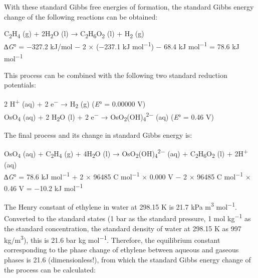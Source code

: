 \documentclass{article}
\begin{document}
With these standard Gibbs free energies of formation, the standard Gibbs energy change of the following reactions can be obtained:

\begin{center}
C\textsubscript{2}H\textsubscript{4} (g) + 2H\textsubscript{2}O (l) → C\textsubscript{2}H\textsubscript{6}O\textsubscript{2} (l) + H\textsubscript{2} (g)\\[2pt]
∆\emph{G}° = −327.2 kJ/mol − 2 × (−237.1 kJ mol\textsuperscript{−1}) − 68.4 kJ mol\textsuperscript{−1} = 78.6 kJ mol\textsuperscript{−1}
\end{center}

This process can be combined with the following two standard reduction potentials:

\begin{center}
2 H\textsuperscript{+} (aq) + 2 e\textsuperscript{−} → H\textsubscript{2} (g) \quad (\emph{E}° = 0.00000 V)\\[2pt]
OsO\textsubscript{4} (aq) + 2 H\textsubscript{2}O (l) + 2 e\textsuperscript{−} → OsO\textsubscript{2}(OH)\textsubscript{4}\textsuperscript{2−} (aq) \quad (\emph{E}° = 0.46 V)
\end{center}

The final process and its change in standard Gibbs energy is:

\begin{center}
OsO\textsubscript{4} (aq) + C\textsubscript{2}H\textsubscript{4} (g) + 4H\textsubscript{2}O (l) → OsO\textsubscript{2}(OH)\textsubscript{4}\textsuperscript{2−} (aq) + C\textsubscript{2}H\textsubscript{6}O\textsubscript{2} (l) + 2H\textsuperscript{+} (aq)\\[2pt]
∆\emph{G}° = 78.6 kJ mol\textsuperscript{−1} + 2 × 96485 C mol\textsuperscript{−1} × 0.000 V − 2 × 96485 C mol\textsuperscript{−1} × 0.46 V = −10.2 kJ mol\textsuperscript{−1}
\end{center}

The Henry constant of ethylene in water at 298.15 K is 21.7 kPa m\textsuperscript{3} mol\textsuperscript{−1}. Converted to the standard states (1 bar as the standard pressure, 1 mol kg\textsuperscript{−1} as the standard concentration, the standard density of water at 298.15 K as 997 kg/m\textsuperscript{3}), this is 21.6 bar kg mol\textsuperscript{−1}. Therefore, the equilibrium constant corresponding to the phase change of ethylene between aqueous and gaseous phases is 21.6 (dimensionless!), from which the standard Gibbs energy change of the process can be calculated:
\end{document}
